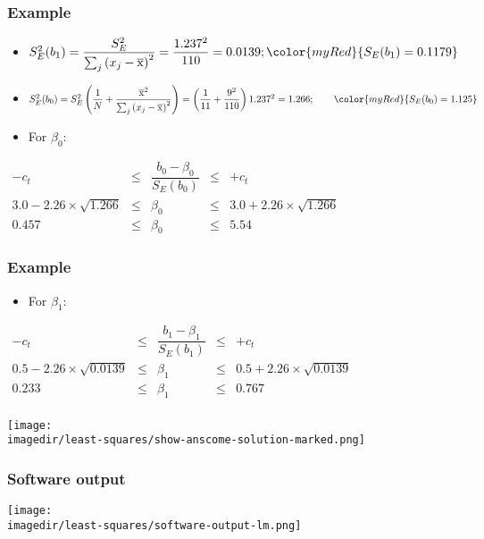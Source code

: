 \begin{frame}\frametitle{Example}
	\begin{itemize}
		\item	$S_E^2(b_1) = \dfrac{S_E^2}{\sum_j{\left( x_j - \overline{\mathrm{x}} \right)^2}} = \dfrac{1.237^2}{110} = 0.0139; {\color{myRed}{S_E(b_1) = 0.1179}}$
		\item	{ $S_E^2(b_0) = S_E^2 \left(\dfrac{1}{N} + \dfrac{\overline{\mathrm{x}}^2}{\sum_j{\left( x_j - \overline{\mathrm{x}} \right)^2}} \right) = \left(\dfrac{1}{11} + \dfrac{9^2}{110} \right)1.237^2 = 1.266; \qquad {\color{myRed}{S_E(b_0) = 1.125}}$}
	\end{itemize}
	\begin{itemize}
		\item	For $\beta_0$:
	\end{itemize}
	$
	\begin{array}{rccclrcccl}
		- c_t &\leq& \dfrac{b_0 - \beta_0}{S_E(b_0)} &\leq & +c_t \\
		3.0 - 2.26 \times \sqrt{1.266} &\leq& \beta_0 &\leq& 3.0 + 2.26 \times \sqrt{1.266} \\
		0.457 &\leq& \beta_0 &\leq& 5.54
	\end{array}
	$
\end{frame}

\begin{frame}\frametitle{Example}
	\begin{itemize}
		\item	For $\beta_1$:
	\end{itemize}
	$
	\begin{array}{rccclrcccl}
		- c_t &\leq& \dfrac{b_1 - \beta_1}{S_E(b_1)} &\leq & +c_t \\
		0.5 - 2.26 \times \sqrt{0.0139} &\leq& \beta_1 &\leq& 0.5 + 2.26 \times \sqrt{0.0139}\\
		0.233 &\leq& \beta_1 &\leq& 0.767 \\
	\end{array}
	$
	\begin{center}
		\texttt{[image: \\imagedir/least-squares/show-anscome-solution-marked.png]}
	\end{center}
\end{frame}

\begin{frame}\frametitle{Software output}
	\begin{center}
		\texttt{[image: \\imagedir/least-squares/software-output-lm.png]}
	\end{center}
\end{frame}

